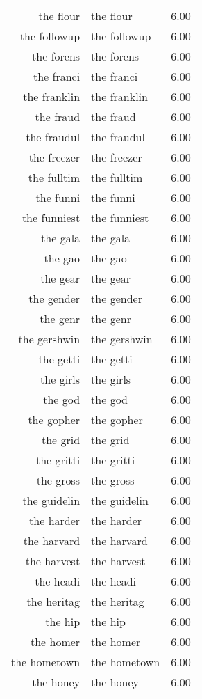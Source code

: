 \begin{table}[ht]
\begin{tabular}{rlr}
  the flour & the flour & 6.00 \\ 
  the followup & the followup & 6.00 \\ 
  the forens & the forens & 6.00 \\ 
  the franci & the franci & 6.00 \\ 
  the franklin & the franklin & 6.00 \\ 
  the fraud & the fraud & 6.00 \\ 
  the fraudul & the fraudul & 6.00 \\ 
  the freezer & the freezer & 6.00 \\ 
  the fulltim & the fulltim & 6.00 \\ 
  the funni & the funni & 6.00 \\ 
  the funniest & the funniest & 6.00 \\ 
  the gala & the gala & 6.00 \\ 
  the gao & the gao & 6.00 \\ 
  the gear & the gear & 6.00 \\ 
  the gender & the gender & 6.00 \\ 
  the genr & the genr & 6.00 \\ 
  the gershwin & the gershwin & 6.00 \\ 
  the getti & the getti & 6.00 \\ 
  the girls & the girls & 6.00 \\ 
  the god & the god & 6.00 \\ 
  the gopher & the gopher & 6.00 \\ 
  the grid & the grid & 6.00 \\ 
  the gritti & the gritti & 6.00 \\ 
  the gross & the gross & 6.00 \\ 
  the guidelin & the guidelin & 6.00 \\ 
  the harder & the harder & 6.00 \\ 
  the harvard & the harvard & 6.00 \\ 
  the harvest & the harvest & 6.00 \\ 
  the headi & the headi & 6.00 \\ 
  the heritag & the heritag & 6.00 \\ 
  the hip & the hip & 6.00 \\ 
  the homer & the homer & 6.00 \\ 
  the hometown & the hometown & 6.00 \\ 
  the honey & the honey & 6.00 \\ 

\end{tabular}
\end{table}
